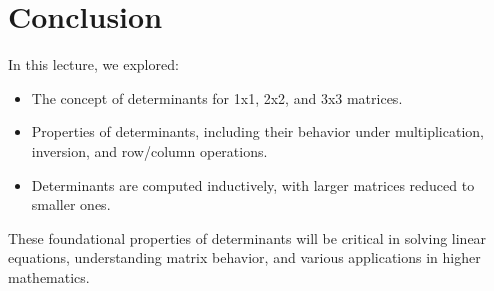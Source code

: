 \documentclass{article}
\begin{document}
\section*{Conclusion}

In this lecture, we explored:
\begin{itemize}
  \item The concept of determinants for 1x1, 2x2, and 3x3 matrices.
  \item Properties of determinants, including their behavior under multiplication, inversion, and row/column operations.
  \item Determinants are computed inductively, with larger matrices reduced to smaller ones.
\end{itemize}

These foundational properties of determinants will be critical in solving linear equations, understanding matrix behavior, and various applications in higher mathematics.
\end{document}

